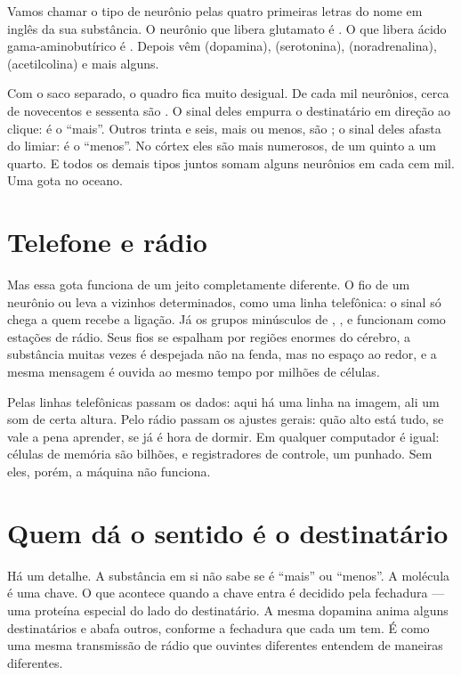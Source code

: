 Vamos chamar o tipo de neurônio pelas quatro primeiras letras do nome em inglês da sua substância. O neurônio que libera glutamato é . O que libera ácido gama-aminobutírico é . Depois vêm  (dopamina),  (serotonina),  (noradrenalina),  (acetilcolina) e mais alguns.

Com o saco separado, o quadro fica muito desigual. De cada mil neurônios, cerca de novecentos e sessenta são . O sinal deles empurra o destinatário em direção ao clique: é o ``mais''. Outros trinta e seis, mais ou menos, são ; o sinal deles afasta do limiar: é o ``menos''. No córtex eles são mais numerosos, de um quinto a um quarto. E todos os demais tipos juntos somam alguns neurônios em cada cem mil. Uma gota no oceano.

\section*{Telefone e rádio}

Mas essa gota funciona de um jeito completamente diferente. O fio de um neurônio  ou  leva a vizinhos determinados, como uma linha telefônica: o sinal só chega a quem recebe a ligação. Já os grupos minúsculos de , ,  e  funcionam como estações de rádio. Seus fios se espalham por regiões enormes do cérebro, a substância muitas vezes é despejada não na fenda, mas no espaço ao redor, e a mesma mensagem é ouvida ao mesmo tempo por milhões de células.

Pelas linhas telefônicas passam os dados: aqui há uma linha na imagem, ali um som de certa altura. Pelo rádio passam os ajustes gerais: quão alto está tudo, se vale a pena aprender, se já é hora de dormir. Em qualquer computador é igual: células de memória são bilhões, e registradores de controle, um punhado. Sem eles, porém, a máquina não funciona.

\section*{Quem dá o sentido é o destinatário}

Há um detalhe. A substância em si não sabe se é ``mais'' ou ``menos''. A molécula é uma chave. O que acontece quando a chave entra é decidido pela fechadura --- uma proteína especial do lado do destinatário. A mesma dopamina anima alguns destinatários e abafa outros, conforme a fechadura que cada um tem. É como uma mesma transmissão de rádio que ouvintes diferentes entendem de maneiras diferentes.


